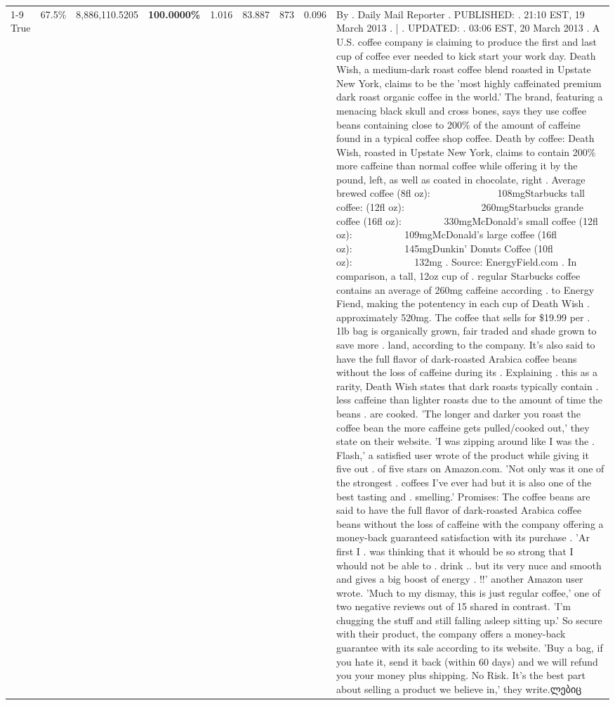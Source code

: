 \begin{table}[H]
{\begin{tabular}{lllrlllll}
\cline{1-9} \cline{2-9}
True & 67.5\% & 8,886,110.5205 & \bfseries \color{red} 100.0000\% & 1.016 & 83.887 & 873 & 0.096 & By . Daily Mail Reporter . PUBLISHED: . 21:10 EST, 19 March 2013 . | . UPDATED: . 03:06 EST, 20 March 2013 . A U.S. coffee company is claiming to produce the first and last cup of coffee ever needed to kick start your work day. Death Wish, a medium-dark roast coffee blend roasted in Upstate New York, claims to be the 'most highly caffeinated premium dark roast organic coffee in the world.' The brand, featuring a menacing black skull and cross bones, says they use coffee beans containing close to 200\% of the amount of caffeine found in a typical coffee shop coffee. Death by coffee: Death Wish, roasted in Upstate New York, claims to contain 200\% more caffeine than normal coffee while offering it by the pound, left, as well as coated in chocolate, right . Average brewed coffee (8fl oz):              108mgStarbucks tall coffee: (12fl oz):                260mgStarbucks grande coffee (16fl oz):         330mgMcDonald's small coffee (12fl oz):           109mgMcDonald's large coffee (16fl oz):           145mgDunkin' Donuts Coffee (10fl oz):             132mg . Source: EnergyField.com . In comparison, a tall, 12oz cup of . regular Starbucks coffee contains an average of 260mg caffeine according . to Energy Fiend, making the potentency in each cup of Death Wish . approximately 520mg. The coffee that sells for \$19.99 per . 1lb bag is organically grown, fair traded and shade grown to save more . land, according to the company. It's also said to have the full flavor of dark-roasted Arabica coffee beans without the loss of caffeine during its . Explaining . this as a rarity, Death Wish states that dark roasts typically contain . less caffeine than lighter roasts due to the amount of time the beans . are cooked. 'The longer and darker you roast the coffee bean the more caffeine gets pulled/cooked out,' they state on their website. 'I was zipping around like I was the . Flash,' a satisfied user wrote of the product while giving it five out . of five stars on Amazon.com. 'Not only was it one of the strongest . coffees I've ever had but it is also one of the best tasting and . smelling.’ Promises: The coffee beans are said to have the full flavor of dark-roasted Arabica coffee beans without the loss of caffeine with the company offering a money-back guaranteed satisfaction with its purchase . 'Ar first I . was thinking that it whould be so strong that I whould not be able to . drink .. but its very nuce and smooth and gives a big boost of energy . !!' another Amazon user wrote. 'Much to my dismay, this is just regular coffee,' one of two negative reviews out of 15 shared in contrast. 'I'm chugging the stuff and still falling asleep sitting up.' So secure with their product, the company offers a money-back guarantee with its sale according to its website. 'Buy a bag, if you hate it, send it back (within 60 days) and we will refund you your money plus shipping. No Risk. It’s the best part about selling a product we believe in,' they write.ლებიც \\

\end{tabular}}
\end{table}

